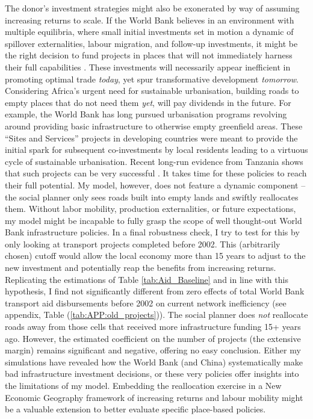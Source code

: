\documentclass[11pt, oneside]{article}   	%
\let\oldref\ref
\renewcommand{\ref}[1]{(\oldref{#1})}
\begin{document}
The donor's investment strategies might also be exonerated by way of assuming increasing returns to scale. If the World Bank believes in an environment with multiple equilibria, where small initial investments set in motion a dynamic of spillover externalities, labour migration, and follow-up investments, it might be the right decision to fund projects in places that will not immediately harness their full capabilities \citep{krugman_history_1991,krugman_increasing_1991,Krugman_UrbanConcentrationRole_1996,Fujita_spatialeconomycities_1999,Duranton_PlaceBasedPoliciesDevelopment_2017}. These investments will necessarily appear inefficient in promoting optimal trade \emph{today}, yet spur transformative development \emph{tomorrow}. Considering Africa's urgent need for sustainable urbanisation, building roads to empty places that do not need them \emph{yet}, will pay dividends in the future. For example, the World Bank has long pursued urbanisation programs revolving around providing basic infrastructure to otherwise empty greenfield areas. These ``Sites and Services'' projects in developing countries were meant to provide the initial spark for subsequent co-investments by local residents leading to a virtuous cycle of sustainable urbanisation. Recent long-run evidence from Tanzania shows that such projects can be very successful \citep{Michaels_PlanningAheadBetter_2018}. It takes time for these policies to reach their full potential. My model, however, does not feature a dynamic component -- the social planner only sees roads built into empty lands and swiftly reallocates them. Without labor mobility, production externalities, or future expectations, my model might be incapable to fully grasp the scope of well thought-out World Bank infrastructure policies. In a final robustness check, I try to test for this by only looking at transport projects completed before 2002. This (arbitrarily chosen) cutoff would allow the local economy more than 15 years to adjust to the new investment and potentially reap the benefits from increasing returns. Replicating the estimations of Table \eqref{tab:Aid_Baseline} and in line with this hypothesis, I find not significantly different from zero effects of total World Bank transport aid disbursements before 2002 on current network inefficiency (see appendix, Table \ref{tab:APP:old_projects}). The social planner does \emph{not} reallocate roads away from those cells that received more infrastructure funding 15+ years ago. However, the estimated coefficient on the number of projects (the extensive margin) remains significant and negative, offering no easy conclusion. Either my simulations have revealed how the World Bank (and China) systematically make bad infrastructure investment decisions, or these very policies offer insights into the limitations of my model. Embedding the reallocation exercise in a New Economic Geography framework of increasing returns and labour mobility might be a valuable extension to better evaluate specific place-based policies.
\end{document}
